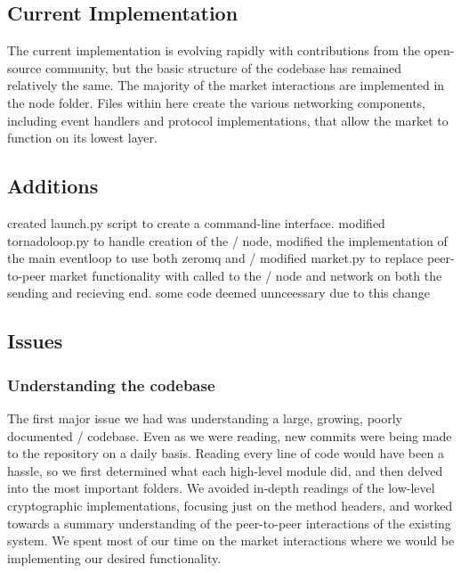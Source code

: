 \documentclass[11pt,twocolumn]{article}
\begin{document}
\subsection{Current Implementation}
The current implementation is evolving rapidly with contributions from the open-source community, but the basic structure of the codebase has remained relatively the same.
The majority of the market interactions are implemented in the node folder.
Files within here create the various networking components, including event handlers and protocol implementations, that allow the market to function on its lowest layer. 

\subsection{Additions}
created launch.py script to create a command-line interface.
modified tornadoloop.py to handle creation of the \Entangled/ node, modified the implementation of the main eventloop to use both zeromq and \Entangled/
modified market.py to replace peer-to-peer market functionality with called to the \Entangled/ node and network on both the sending and recieving end. some code deemed unnceessary due to this change

\subsection{Issues}

\subsubsection{Understanding the codebase}
The first major issue we had was understanding a large, growing, poorly documented \OpenBazaar/ codebase.
Even as we were reading, new commits were being made to the repository on a daily basis.
Reading every line of code would have been a hassle, so we first determined what each high-level module did, and then delved into the most important folders.
We avoided in-depth readings of the low-level cryptographic implementations, focusing just on the method headers, and worked towards a summary understanding of the peer-to-peer interactions of the existing system.
We spent most of our time on the market interactions where we would be implementing our desired functionality.
\end{document}
